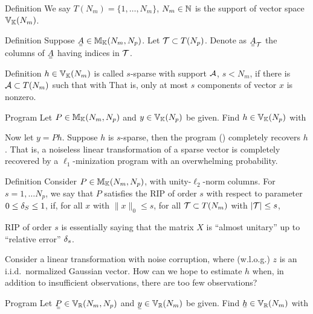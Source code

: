 \Result
{Definition}
{
We say \(T (N_m) =\{1, \dotsc, N_m\}\), \(N_m \in \mathbb{N}\) is the support of vector space \(\mathbb{V}_{\mathbb{K}} (N_m)\).
}

\Result
{Definition}
{
Suppose \(\M{A} \in \MB{M}_{\MB{K}} (N_m, N_p)\).
Let \(\mathcal{T} \subset T (N_p)\).
Denote as \(\M{A}_{\MC{T}}\) the columns of \(\M{A}\) having indices in \(\mathcal{T}\).
}

\Result
{Definition}
{
\(h \in \mathbb{V}_{\mathbb{K}} (N_m)\) is called \(s\)-sparse with support \(\mathcal{A}\), \(s <N_m\), if there is \(\mathcal{A} \subset T (N_m)\) such that
%
with
That is, only at most \(s\) components of vector \(x\) is nonzero.
}

\Result
{Program}
{
Let \(P \in \mathbb{M}_{\mathbb{K}} (N_m, N_p)\) and \(y \in \mathbb{V}_{\mathbb{K}} (N_p)\) be given.
Find \(h \in \mathbb{V}_{\mathbb{K}} (N_p)\) with
%
}

Now let \(y =P h\).
Suppose \(h\) is \(s\)-sparse, then the program () completely recovers \(h\).
That is, a noiseless linear transformation of a sparse vector is completely recovered by a \(\ell_1\)-minization program with an overwhelming probability.

\Result
{Definition}
{
Consider \(P \in \mathbb{M}_{\mathbb{K}} (N_m, N_p)\), with unity-\(\ell_2\)-norm columns.
For \(s =1, \dotsc N_p\), we say that \(P\) satisfies the RIP of order \(s\) with respect to parameter \(0 \leq \delta_S \leq 1\), if, for all \(x\) with \(\|x\|_0 \leq s\), for all \(\mathcal{T} \subset T(N_m)\) with \(|\mathcal{T}| \leq s\),
%
}

RIP of order \(s\) is essentially saying that the matrix \(X\) is ``almost unitary'' up to ``relative error'' \(\delta_s\).

Consider a linear transformation with noise corruption,
%
%
where (w.l.o.g.) \(z\) is an i.i.d.\ normalized Gaussian vector.
How can we hope to estimate \(h\) when, in addition to insufficient observations, there are too few observations?

\Result
{Program}
{
Let \(\M{P} \in \MB{V}_\MB{R} (N_m, N_p)\) and \(\V{y} \in \MB{V}_\MB{R} (N_m)\) be given.
Find \(\V{h} \in \MB{V}_\MB{R} (N_m)\) with
%
}

